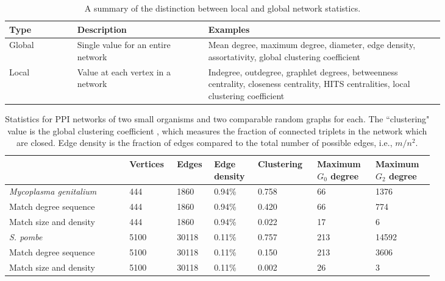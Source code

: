 \documentclass[12pt]{thesis}
\theoremstyle{plain}
\theoremstyle{definition}
\theoremstyle{remark}
\begin{document}
\begin{table}[!t]
\renewcommand{\arraystretch}{1.5}
\centering
\begin{tabular}{L{0.13\linewidth}L{0.25\linewidth}L{0.45\linewidth}}
\hline
\textbf{Type} & \textbf{Description} & \textbf{Examples} \\ \hline
Global & Single value for an entire network & Mean degree, maximum degree, diameter, edge density, assortativity, global clustering coefficient \\ 
Local & Value at each vertex in a network & Indegree, outdegree, graphlet degrees, betweenness centrality, closeness centrality, HITS centralities, local clustering coefficient  \\
\hline
\end{tabular}
\caption{A summary of the distinction between local and global network statistics.}
\label{tab:local_vs_global_statistics}
\end{table}



\begin{table}[t]
\centering
{\fontsize{11}{13}\selectfont
\begin{tabular}{L{0.25\linewidth}C{0.085\linewidth}C{0.065\linewidth}C{0.08\linewidth}C{0.11\linewidth}C{0.11\linewidth}C{0.11\linewidth}}
\hline
 & Vertices & Edges & Edge density & Clustering & Maximum $G_0$ degree & Maximum $G_2$ degree \\ \hline

\textit{Mycoplasma genitalium} & 444 & 1860 &  0.94\% & 0.758 & 66 & 1376 \\ 
Match degree sequence & 444 & 1860 & 0.94\% & 0.420 & 66 & 774  \\ 
Match size and density & 444 & 1860 & 0.94\% &  0.022 & 17 & 6 \\ \hline
\textit{S. pombe} & 5100 & 30118 & 0.11\%  & 0.757 & 213 & 14592 \\ 
Match degree sequence & 5100 & 30118 & 0.11\%  & 0.150 & 213 & 3606 \\ 
Match size and density & 5100 & 30118 & 0.11\%  & 0.002 & 26 & 3 \\ \hline
\end{tabular}
}
\caption{Statistics for PPI networks of two small organisms and two comparable random graphs for each. The ``clustering" value is the global clustering coefficient \cite{newman2010}, which measures the fraction of connected triplets in the network which are closed. Edge density is the fraction of edges compared to the total number of possible edges, i.e., $m/n^2$.}
\label{tab:ppi_networks}
\end{table}
\end{document}

